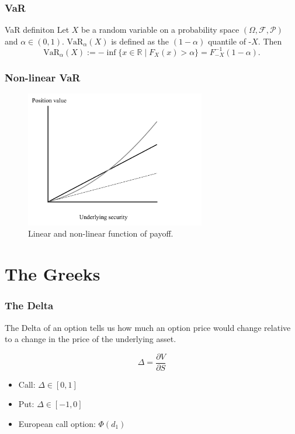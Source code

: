 \documentclass{beamer}
\newcommand{\R}{\mathbb R}
\newcommand{\f}{\mathcal F}
\begin{document}
\begin{frame}
    \frametitle{VaR}
    \begin{block}{VaR definiton}
        Let $X$ be a random variable on a probability space $(\Omega, \f, \mathcal{P})$ and $\alpha \in (0, 1)$.
        $\text{VaR}_\alpha(X)$ is defined as the $(1-\alpha)$ quantile of -$X$. Then
        $$
        \text{VaR}_\alpha(X) := - \inf \{ x \in \R \mid F_X(x) > \alpha \} = F^{-1}_{-X}(1-\alpha).
        $$
    \end{block}
\end{frame}

\begin{frame}
    \frametitle{Non-linear VaR}
    \begin{figure}\label{payoff}
        \includegraphics[width=0.7\textwidth]{payoff.jpg}
        \caption{Linear and non-linear function of payoff.}
    \end{figure}
\end{frame}

\section{The Greeks}

\begin{frame}
    \frametitle{The Delta}
    The Delta of an option tells us how much an option price 
    would change relative to a change in the price of the 
    underlying asset.\pause
    

    \begin{block}{}
        $$
        \Delta = \frac{\partial V}{\partial S}
        $$ 
    \end{block}
    \begin{itemize}
        \item<3-> Call: $\Delta\in [0,1]$
        \item<4-> Put: $\Delta\in [-1,0]$
        \item<5-> European call option: $\Phi(d_1)$
    \end{itemize}
\end{frame}
\end{document}
